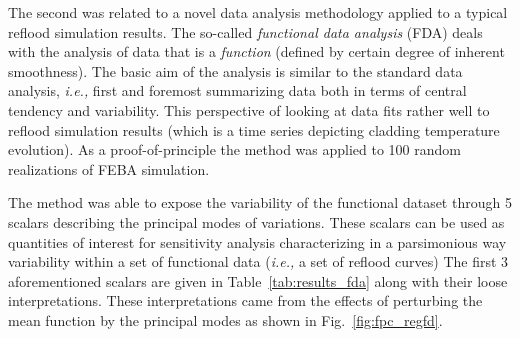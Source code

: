 \documentclass[11pt,titlepage]{article}
\begin{document}
The second was related to a novel data analysis methodology applied to a 
typical reflood simulation results.
The so-called \textit{functional data analysis} (FDA) deals with the 
analysis of data that is a \textit{function} (defined by certain degree of 
inherent smoothness). 
The basic aim of the analysis is similar to the standard data analysis, 
\textit{i.e.,} first and foremost summarizing data both in terms of 
central tendency and variability. 
This perspective of looking at data fits rather well to reflood simulation 
results (which is a time series depicting cladding temperature evolution).
As a proof-of-principle the method was applied to 100 random realizations
of FEBA simulation.

The method was able to expose the variability of the functional dataset 
through 5 scalars describing the principal modes of variations.
These scalars can be used as quantities of interest for sensitivity 
analysis characterizing in a parsimonious way variability within a 
set of functional data (\textit{i.e.,} a set of reflood curves)
The first 3 aforementioned scalars are given in Table~\ref{tab:results_fda} 
along with their loose interpretations. 
These interpretations came from the effects of perturbing the mean function 
by the principal modes as shown in Fig.~\ref{fig:fpc_regfd}.
    
\end{document}
